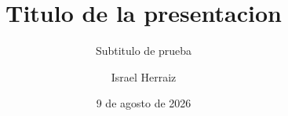 \documentclass[aspectratio=169]{beamer}
\title{Titulo de la presentacion}
\subtitle{Subtitulo de prueba}
\author{Israel Herraiz}
\date{9 de agosto de 2026}
\begin{document}
\begin{frame}[plain]
  \titlepage
\end{frame}
\end{document}
